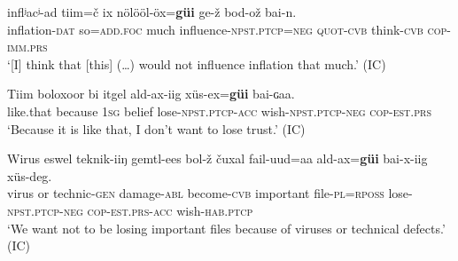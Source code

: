 \documentclass[output=paper,colorlinks,citecolor=brown,chinesefont]{langscibook}
\begin{document}
    \ex\label{ex:kha:84b}
        \gll inflʲacʲ-ad   tiim=č ix nölööl-öx=\textbf{güi} ge-ž bod-ož bai-n. \\
             inflation-\textsc{dat}   so=\textsc{add.foc}  much influence-\textsc{npst.ptcp=neg} \textsc{quot-cvb} think-\textsc{cvb} \textsc{cop-imm.prs}\\
        \glt ‘[I] think that [this] (…) would not influence inflation that much.’ (IC)
    \z
\z 


\ea\label{ex:kha:85}
    \ea\label{ex:kha:85a}
        \gll Tiim boloxoor bi itgel ald-ax-iig xüs-ex=\textbf{güi} bai-ɢaa. \\ 
             like.that because \textsc{1sg} belief lose-\textsc{npst.ptcp-acc} wish-\textsc{npst.ptcp-neg} \textsc{cop-est.prs} \\
        \glt ‘Because it is like that, I don’t want to lose trust.’ (IC)
    
    \ex\label{ex:kha:85b}
        \gll Wirus eswel teknik-iiŋ gemtl-ees bol-ž čuxal fail-uud=aa ald-ax=\textbf{güi} bai-x-iig xüs-deg.\\
             virus or technic-\textsc{gen} damage-\textsc{abl} become-\textsc{cvb} important file-\textsc{pl=rposs} lose-\textsc{npst.ptcp-neg} \textsc{cop-est.prs-acc} wish-\textsc{hab.ptcp}\\
        \glt ‘We want not to be losing important files because of viruses or technical defects.’ (IC)
    \z
\z 
\end{document}
